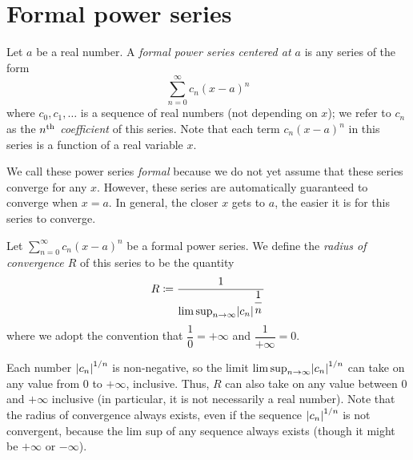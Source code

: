 \section{Formal power series}\label{ii:sec:4.1}

\begin{defn}\label{ii:4.1.1}
  Let \(a\) be a real number.
  A \emph{formal power series centered at \(a\)} is any series of the form
  \[
    \sum_{n = 0}^\infty c_n (x - a)^n
  \]
  where \(c_0, c_1, \dots\) is a sequence of real numbers (not depending on \(x\));
  we refer to \(c_n\) as the \emph{\(n^{\operatorname{th}}\) coefficient} of this series.
  Note that each term \(c_n (x - a)^n\) in this series is a function of a real variable \(x\).
\end{defn}

\begin{note}
  We call these power series \emph{formal} because we do not yet assume that these series converge for any \(x\).
  However, these series are automatically guaranteed to converge when \(x = a\).
  In general, the closer \(x\) gets to \(a\), the easier it is for this series to converge.
\end{note}

\setcounter{thm}{2}
\begin{defn}\label{ii:4.1.3}
  Let \(\sum_{n = 0}^\infty c_n (x - a)^n\) be a formal power series.
  We define the \emph{radius of convergence \(R\)} of this series to be the quantity
  \[
    R \coloneqq \dfrac{1}{\limsup_{n \to \infty} \abs{c_n}^{\dfrac{1}{n}}}
  \]
  where we adopt the convention that \(\dfrac{1}{0} = +\infty\) and \(\dfrac{1}{+\infty} = 0\).
\end{defn}

\begin{rmk}\label{ii:4.1.4}
  Each number \(\left\lvert c_n\right\rvert^{1 / n}\) is non-negative, so the limit \(\limsup_{n \to \infty} \abs{c_n}^{1 / n}\) can take on any value from \(0\) to \(+\infty\), inclusive.
  Thus, \(R\) can also take on any value between \(0\) and \(+\infty\) inclusive
  (in particular, it is not necessarily a real number).
  Note that the radius of convergence always exists, even if the sequence \(\left\lvert c_n\right\rvert^{1 / n}\) is not convergent, because the lim sup of any sequence always exists
  (though it might be \(+\infty\) or \(-\infty\)).
\end{rmk}

